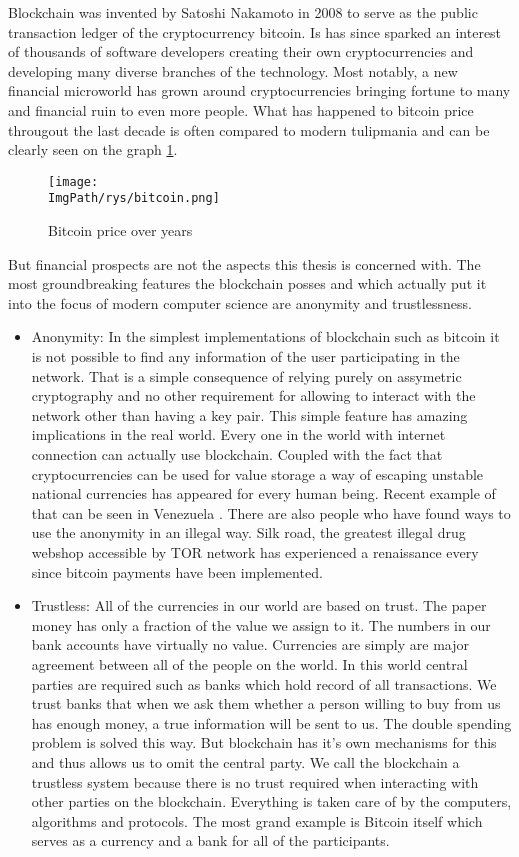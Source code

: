 \documentclass[a4paper,12pt,twoside,openany]{report}
\newcommand{\ImgPath}{.}
\begin{document}
Blockchain was invented by Satoshi Nakamoto in 2008 to serve as the public transaction ledger of the cryptocurrency bitcoin. \cite{Bitcoin} Is has since sparked an interest of thousands of software developers creating their own cryptocurrencies and developing many diverse branches of the technology. Most notably, a new financial microworld has grown around cryptocurrencies bringing fortune to many and financial ruin to even more people. What has happened to bitcoin price througout the last decade is often compared to modern tulipmania and can be clearly seen on the graph \ref{bitcoin}. 
\begin{figure}[!htbp]
	\begin{center}
\centering
\texttt{[image: \\ImgPath/rys/bitcoin.png]}
\end{center}
	\caption{Bitcoin price over years}
	\label{bitcoin}
\end{figure}

But financial prospects are not the aspects this thesis is concerned with. The most groundbreaking features the blockchain posses and which actually put it into the focus of modern computer science are anonymity and trustlessness.
\begin{itemize}
\item Anonymity: In the simplest implementations of blockchain such as bitcoin it is not possible to find any information of the user participating in the network. That is a simple consequence of relying purely on assymetric cryptography and no other requirement for allowing to interact with the network other than having a key pair. This simple feature has amazing implications in the real world. Every one in the world with internet connection can actually use blockchain. Coupled with the fact that cryptocurrencies can be used for value storage a way of escaping unstable national currencies has appeared for every human being. Recent example of that can be seen in Venezuela .\cite{Venezuela} There are also people who have found ways to use the anonymity in an illegal way. Silk road, the greatest illegal drug webshop accessible by TOR network has experienced a renaissance every since bitcoin payments have been implemented. \cite{Silkroad}

\item Trustless: All of the currencies in our world are based on trust. The paper money has only a fraction of the value we assign to it. The numbers in our bank accounts have virtually no value. Currencies are simply are major agreement between all of the people on the world. In this world central parties are required such as banks which hold record of all transactions. We trust banks that when we ask them whether a person willing to buy from us has enough money, a true information will be sent to us. The double spending problem is solved this way. But blockchain has it's own mechanisms for this and thus allows us to omit the central party. We call the blockchain a trustless system because there is no trust required when interacting with other parties on the blockchain. Everything is taken care of by the computers, algorithms and protocols. The most grand example is Bitcoin itself which serves as a currency and a bank for all of the participants.
\end{itemize}
\end{document}
